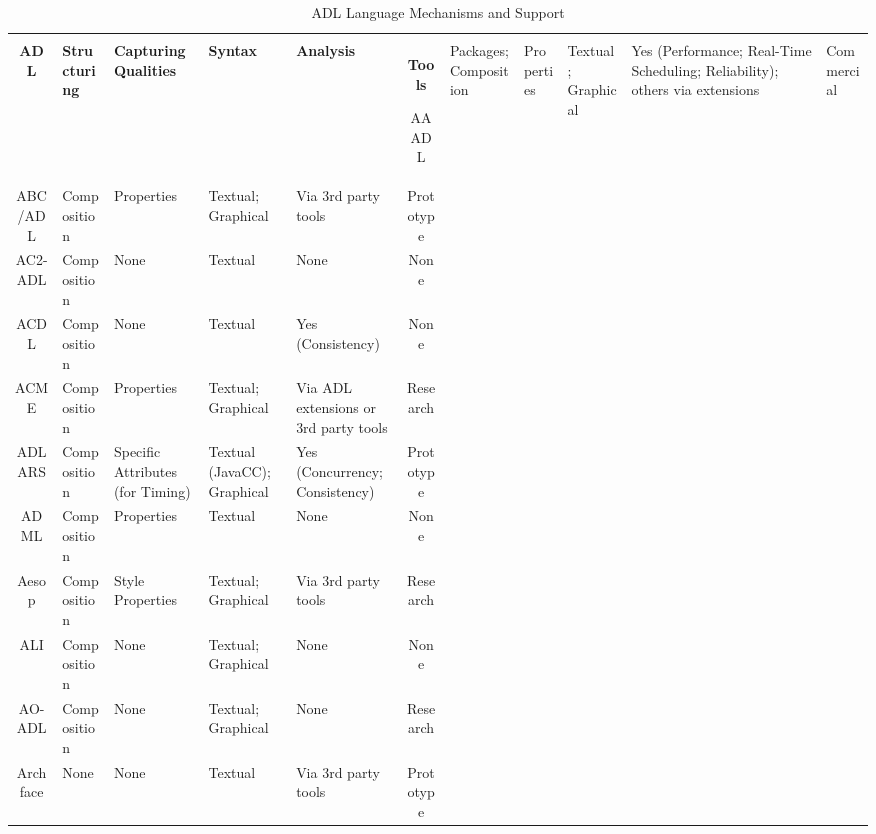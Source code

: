 \begin{landscape}
\footnotesize
\begin{longtable}{|c|P{2cm}|P{3cm}|P{3cm}|p{2cm}|c|} 
\label{table:adl-mechanisms} \\
\caption{ADL Language Mechanisms and Support} \\
\endfirsthead
\caption[]{ADL Language Mechanisms and Support} \\
\endhead
\hline

\textbf{ADL} & \textbf{Structuring} & \textbf{Capturing Qualities} & \textbf{Syntax} & \textbf{Analysis} & \textbf{Tools}
\endhead

\hline

AAADL & Packages; Composition & Properties & Textual; Graphical & Yes (Performance; Real-Time Scheduling; Reliability); others via extensions & Commercial \\
\hline

ABC/ADL & Composition & Properties & Textual; Graphical & Via 3rd party tools & Prototype \\
\hline

AC2-ADL & Composition & None & Textual & None & None \\
\hline
ACDL & Composition & None & Textual & Yes (Consistency) & None \\ 
\hline

ACME & Composition & Properties & Textual; Graphical & Via ADL extensions or 3rd party tools & Research \\ 
\hline

ADLARS & Composition & Specific Attributes (for Timing) & Textual (JavaCC); Graphical & Yes (Concurrency; Consistency) & Prototype \\ 
\hline

ADML & Composition & Properties & Textual & None & None \\ 
\hline

Aesop & Composition & Style Properties & Textual; Graphical & Via 3rd party tools & Research \\ 
\hline

ALI & Composition & None & Textual; Graphical & None & None \\ 
\hline

AO-ADL & Composition & None & Textual; Graphical & None & Research \\ 
\hline

Archface & None & None & Textual & Via 3rd party tools & Prototype \\ 
\hline


\end{longtable}
\end{landscape}
